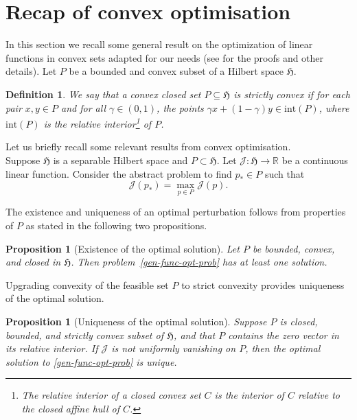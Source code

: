 \documentclass{amsart}
\newtheorem{definition}[theorem]{Definition}
\newtheorem{proposition}[theorem]{Proposition}
\newcommand\fH{{\mathfrak H}}
\begin{document}
\section{Recap of convex optimisation}\label{appendix}
In this section we recall some general result on the optimization of linear functions in convex sets adapted for our needs (see \cite{AFG22} for the proofs and other details).  
Let \(P\) be a bounded and convex subset of a Hilbert space \(\fH\).
\begin{definition}
\label{stconv}We say that a convex closed set $P\subseteq \fH$ is \emph{strictly convex} if for each pair $x,y\in P$ and for all $\gamma\in(0,1)$, the points $\gamma x+(1-\gamma)y\in \mathrm{int}(P)$, where \(\mathrm{int}(P)\) is the relative interior\footnote{The relative interior of a closed convex set $C$ is the interior of $C$ relative to the closed affine hull of $C$.} of \(P\).
\end{definition}

Let us briefly recall some relevant results from convex optimisation.\\
Suppose $\fH$ is a separable Hilbert space and $P\subset \fH$. Let $\mathcal{J}:\fH\rightarrow {\mathbb{R}}$ be a continuous linear
function. Consider the abstract problem to find $p_*\in P$ such that 
\begin{equation}
\mathcal{J}(p_*)=\max_{p\in P}\mathcal{J}(p) .  \label{gen-func-opt-prob}
\end{equation}%

The existence and uniqueness of an optimal perturbation follows from
properties of $P$ as stated in the following two propositions.

\begin{proposition}[Existence of the optimal solution]
\label{prop:exist} Let $P$ be bounded, convex, and closed in $\fH$.
Then problem~\eqref{gen-func-opt-prob} has at least one solution.
\end{proposition}

Upgrading convexity of the feasible set $P$ to strict convexity provides
uniqueness of the optimal solution.

\begin{proposition}[Uniqueness of the optimal solution]
\label{prop:uniqe} Suppose $P$ is closed, bounded, and strictly convex
subset of $\fH$, and that $P$ contains the zero vector in its
relative interior. If $\mathcal{J}$ is not uniformly vanishing on $P$, then the optimal solution to \eqref{gen-func-opt-prob} is unique.
\end{proposition}
\end{document}
